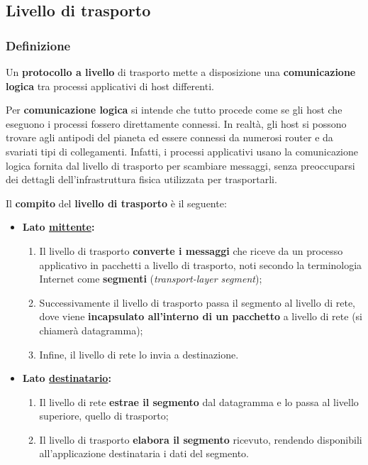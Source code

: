 \documentclass[a4paper]{article}
\begin{document}
	\subsection{Livello di trasporto}
	
	\subsubsection{Definizione}
	
	Un \textcolor{Red3}{\textbf{protocollo a livello}} di trasporto mette a disposizione una \textbf{comunicazione logica} tra processi applicativi di host differenti.\newline
	
	\noindent
	Per \textbf{comunicazione logica} si intende che tutto procede come se gli host che eseguono i processi fossero direttamente connessi. In realtà, gli host si possono trovare agli antipodi del pianeta ed essere connessi da numerosi router e da svariati tipi di collegamenti. Infatti, i processi applicativi usano la comunicazione logica fornita dal livello di trasporto per scambiare messaggi, senza preoccuparsi dei dettagli dell’infrastruttura fisica utilizzata per trasportarli.\newline
	
	\noindent
	Il \textbf{compito} del \textbf{livello di trasporto} è il seguente:
	\begin{itemize}
		\item \textbf{Lato \underline{mittente}:}
		\begin{enumerate}[label=\alph*)]
			\item Il livello di trasporto \textbf{converte i messaggi} che riceve da un processo applicativo in pacchetti a livello di trasporto, noti secondo la terminologia Internet come \textbf{segmenti} (\emph{transport-layer segment});
			\item Successivamente il livello di trasporto passa il segmento al livello di rete, dove viene \textbf{incapsulato all’interno di un pacchetto} a livello di rete (si chiamerà datagramma);
			\item Infine, il livello di rete lo invia a destinazione.
		\end{enumerate}
		
		\item \textbf{Lato \underline{destinatario}:}
		\begin{enumerate}[label=\alph*)]
			\item Il livello di rete \textbf{estrae il segmento} dal datagramma e lo passa al livello superiore, quello di trasporto;
			\item Il livello di trasporto \textbf{elabora il segmento} ricevuto, rendendo disponibili all'applicazione destinataria i dati del segmento.
		\end{enumerate}
	\end{itemize}
\end{document}
